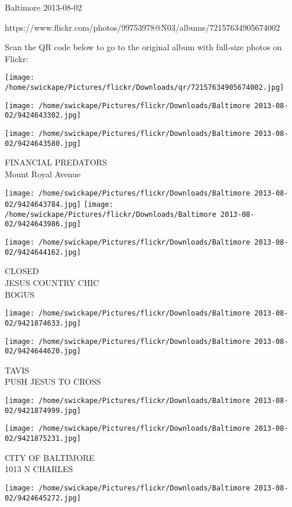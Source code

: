 \documentclass[10pt,letterpaper]{article}
\begin{document}
Baltimore 2013-08-02

https://www.flickr.com/photos/99753978@N03/albums/72157634905674002

Scan the QR code below to go to the original album with full-size photos on Flickr:

\texttt{[image: /home/swickape/Pictures/flickr/Downloads/qr/72157634905674002.jpg]}
\pagebreak

\texttt{[image: /home/swickape/Pictures/flickr/Downloads/Baltimore 2013-08-02/9424643302.jpg]}

\vspace{0.25in}
\texttt{[image: /home/swickape/Pictures/flickr/Downloads/Baltimore 2013-08-02/9424643580.jpg]}

FINANCIAL PREDATORS\\
Mount Royal Avenue
\pagebreak

\texttt{[image: /home/swickape/Pictures/flickr/Downloads/Baltimore 2013-08-02/9424643784.jpg]}
\texttt{[image: /home/swickape/Pictures/flickr/Downloads/Baltimore 2013-08-02/9424643986.jpg]}

\vspace{0.25in}
\texttt{[image: /home/swickape/Pictures/flickr/Downloads/Baltimore 2013-08-02/9424644162.jpg]}

CLOSED\\
JESUS COUNTRY CHIC\\
BOGUS
\pagebreak

\texttt{[image: /home/swickape/Pictures/flickr/Downloads/Baltimore 2013-08-02/9421874633.jpg]}

\vspace{0.25in}
\texttt{[image: /home/swickape/Pictures/flickr/Downloads/Baltimore 2013-08-02/9424644620.jpg]}

TAVIS\\
PUSH JESUS TO CROSS
\pagebreak

\texttt{[image: /home/swickape/Pictures/flickr/Downloads/Baltimore 2013-08-02/9421874999.jpg]}

\vspace{0.25in}
\texttt{[image: /home/swickape/Pictures/flickr/Downloads/Baltimore 2013-08-02/9421875231.jpg]}

CITY OF BALTIMORE\\
1013 N CHARLES
\pagebreak

\texttt{[image: /home/swickape/Pictures/flickr/Downloads/Baltimore 2013-08-02/9424645272.jpg]}
\end{document}
